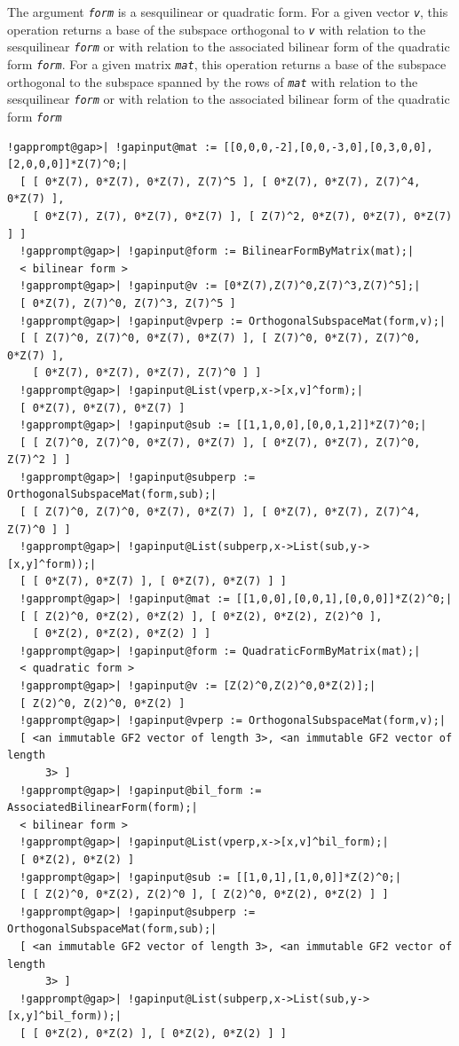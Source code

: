 \documentclass[a4paper,11pt]{report}
\begin{document}
{{{ The argument \mbox{\texttt{\mdseries\slshape form}} is a sesquilinear or quadratic form. For a given vector \mbox{\texttt{\mdseries\slshape v}}, this operation returns a base of the subspace orthogonal to \mbox{\texttt{\mdseries\slshape v}} with relation to the sesquilinear \mbox{\texttt{\mdseries\slshape form}} or with relation to the associated bilinear form of the quadratic form \mbox{\texttt{\mdseries\slshape form}}. For a given matrix \mbox{\texttt{\mdseries\slshape mat}}, this operation returns a base of the subspace orthogonal to the subspace
spanned by the rows of \mbox{\texttt{\mdseries\slshape mat}} with relation to the sesquilinear \mbox{\texttt{\mdseries\slshape form}} or with relation to the associated bilinear form of the quadratic form \mbox{\texttt{\mdseries\slshape form}} 
\begin{Verbatim}[commandchars=!@|,fontsize=\small,frame=single,label=Example]
  !gapprompt@gap>| !gapinput@mat := [[0,0,0,-2],[0,0,-3,0],[0,3,0,0],[2,0,0,0]]*Z(7)^0;|
  [ [ 0*Z(7), 0*Z(7), 0*Z(7), Z(7)^5 ], [ 0*Z(7), 0*Z(7), Z(7)^4, 0*Z(7) ], 
    [ 0*Z(7), Z(7), 0*Z(7), 0*Z(7) ], [ Z(7)^2, 0*Z(7), 0*Z(7), 0*Z(7) ] ]
  !gapprompt@gap>| !gapinput@form := BilinearFormByMatrix(mat);|
  < bilinear form >
  !gapprompt@gap>| !gapinput@v := [0*Z(7),Z(7)^0,Z(7)^3,Z(7)^5];|
  [ 0*Z(7), Z(7)^0, Z(7)^3, Z(7)^5 ]
  !gapprompt@gap>| !gapinput@vperp := OrthogonalSubspaceMat(form,v);|
  [ [ Z(7)^0, Z(7)^0, 0*Z(7), 0*Z(7) ], [ Z(7)^0, 0*Z(7), Z(7)^0, 0*Z(7) ], 
    [ 0*Z(7), 0*Z(7), 0*Z(7), Z(7)^0 ] ]
  !gapprompt@gap>| !gapinput@List(vperp,x->[x,v]^form);|
  [ 0*Z(7), 0*Z(7), 0*Z(7) ]
  !gapprompt@gap>| !gapinput@sub := [[1,1,0,0],[0,0,1,2]]*Z(7)^0;|
  [ [ Z(7)^0, Z(7)^0, 0*Z(7), 0*Z(7) ], [ 0*Z(7), 0*Z(7), Z(7)^0, Z(7)^2 ] ]
  !gapprompt@gap>| !gapinput@subperp := OrthogonalSubspaceMat(form,sub);|
  [ [ Z(7)^0, Z(7)^0, 0*Z(7), 0*Z(7) ], [ 0*Z(7), 0*Z(7), Z(7)^4, Z(7)^0 ] ]
  !gapprompt@gap>| !gapinput@List(subperp,x->List(sub,y->[x,y]^form));|
  [ [ 0*Z(7), 0*Z(7) ], [ 0*Z(7), 0*Z(7) ] ]
  !gapprompt@gap>| !gapinput@mat := [[1,0,0],[0,0,1],[0,0,0]]*Z(2)^0;|
  [ [ Z(2)^0, 0*Z(2), 0*Z(2) ], [ 0*Z(2), 0*Z(2), Z(2)^0 ], 
    [ 0*Z(2), 0*Z(2), 0*Z(2) ] ]
  !gapprompt@gap>| !gapinput@form := QuadraticFormByMatrix(mat);|
  < quadratic form >
  !gapprompt@gap>| !gapinput@v := [Z(2)^0,Z(2)^0,0*Z(2)];|
  [ Z(2)^0, Z(2)^0, 0*Z(2) ]
  !gapprompt@gap>| !gapinput@vperp := OrthogonalSubspaceMat(form,v);|
  [ <an immutable GF2 vector of length 3>, <an immutable GF2 vector of length 
      3> ]
  !gapprompt@gap>| !gapinput@bil_form := AssociatedBilinearForm(form);|
  < bilinear form >
  !gapprompt@gap>| !gapinput@List(vperp,x->[x,v]^bil_form);|
  [ 0*Z(2), 0*Z(2) ]
  !gapprompt@gap>| !gapinput@sub := [[1,0,1],[1,0,0]]*Z(2)^0;|
  [ [ Z(2)^0, 0*Z(2), Z(2)^0 ], [ Z(2)^0, 0*Z(2), 0*Z(2) ] ]
  !gapprompt@gap>| !gapinput@subperp := OrthogonalSubspaceMat(form,sub);|
  [ <an immutable GF2 vector of length 3>, <an immutable GF2 vector of length 
      3> ]
  !gapprompt@gap>| !gapinput@List(subperp,x->List(sub,y->[x,y]^bil_form));|
  [ [ 0*Z(2), 0*Z(2) ], [ 0*Z(2), 0*Z(2) ] ]
   

\end{Verbatim}}}}
\end{document}
